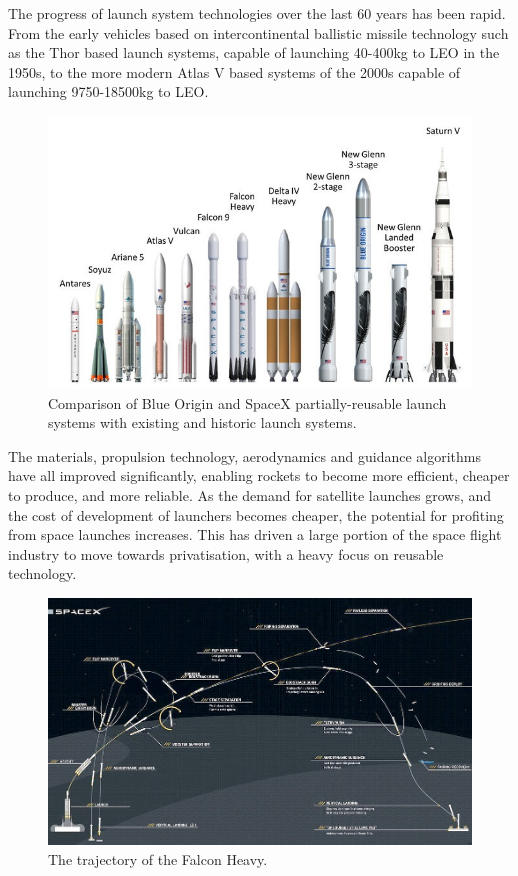     
    The progress of launch system technologies over the last 60 years has been rapid. From the early vehicles based on intercontinental ballistic missile technology such as the Thor based launch systems, capable of launching 40-400kg to LEO in the 1950s, to the more modern Atlas V based systems of the 2000s capable of launching 9750-18500kg to LEO\cite{Kendall2010}. 
         \begin{figure}[ht]
         	\centering
         	\includegraphics[width=0.9\linewidth]{figures/2_literature-review/LaunchVehicles}
         	\caption{Comparison of Blue Origin and SpaceX partially-reusable launch systems with existing and historic launch systems\cite{BlueOrigin}.}
         	\label{fig:LaunchVehicles}
         \end{figure}
    The materials, propulsion technology, aerodynamics and guidance algorithms have all improved significantly, enabling  rockets to become more efficient, cheaper to produce, and more reliable. As the demand for satellite launches grows, and the cost of development of launchers becomes cheaper, the potential for profiting from space launches increases. 
    This has driven a large portion of the space flight industry to move towards privatisation, with a heavy focus on reusable technology. 
        \begin{figure}[ht]
        	\centering
        	\includegraphics[width=1\linewidth]{"figures/2_literature-review/FalconTrajectory"}
        	\caption{The trajectory of the Falcon Heavy\cite{FalconHeavy}.}
        	\label{fig:FalconTrajectory}
        \end{figure}

